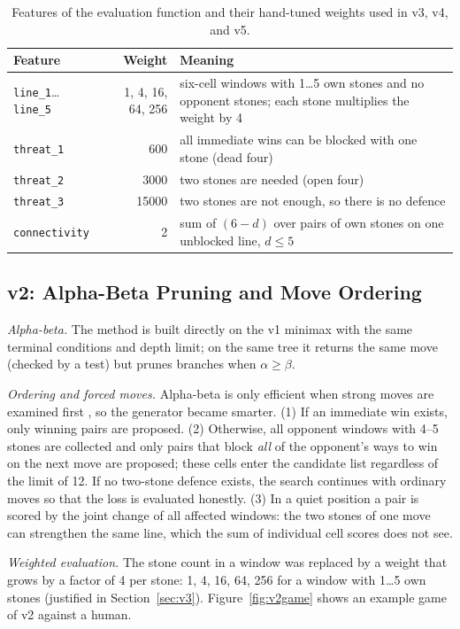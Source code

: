 \documentclass[a4paper,10pt,twocolumn]{article}
\newcommand{\code}[1]{\texttt{#1}}
\begin{document}
\begin{table}[b]
\centering
\caption{Features of the evaluation function and their hand-tuned weights used in v3, v4, and v5.}
\label{tab:features}
\begin{tabularx}{\textwidth}{@{}lrX@{}}
\toprule
Feature & Weight & Meaning \\
\midrule
\code{line\_1}\ldots\code{line\_5} & 1, 4, 16, 64, 256 & six-cell windows with 1\ldots5 own stones and no opponent stones; each stone multiplies the weight by 4 \\
\code{threat\_1} & 600 & all immediate wins can be blocked with one stone (dead four) \\
\code{threat\_2} & 3000 & two stones are needed (open four) \\
\code{threat\_3} & 15000 & two stones are not enough, so there is no defence \\
\code{connectivity} & 2 & sum of $(6-d)$ over pairs of own stones on one unblocked line, $d\le5$ \\
\bottomrule
\end{tabularx}
\end{table}

\subsection{v2: Alpha-Beta Pruning and Move Ordering}
\emph{Alpha-beta.} The method is built directly on the v1 minimax with the same terminal conditions and depth limit; on the same tree it returns the same move (checked by a test) but prunes branches when $\alpha\ge\beta$.

\emph{Ordering and forced moves.} Alpha-beta is only efficient when strong moves are examined first \citep{knuth1975alphabeta}, so the generator became smarter. (1) If an immediate win exists, only winning pairs are proposed. (2) Otherwise, all opponent windows with 4--5 stones are collected and only pairs that block \emph{all} of the opponent's ways to win on the next move are proposed; these cells enter the candidate list regardless of the limit of 12. If no two-stone defence exists, the search continues with ordinary moves so that the loss is evaluated honestly. (3) In a quiet position a pair is scored by the joint change of all affected windows: the two stones of one move can strengthen the same line, which the sum of individual cell scores does not see.

\emph{Weighted evaluation.} The stone count in a window was replaced by a weight that grows by a factor of 4 per stone: 1, 4, 16, 64, 256 for a window with 1\ldots5 own stones (justified in Section~\ref{sec:v3}). Figure~\ref{fig:v2game} shows an example game of v2 against a human.
\end{document}
